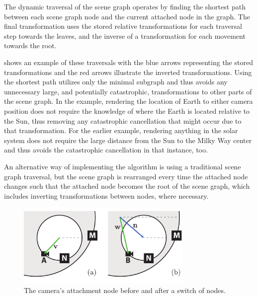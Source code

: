 The dynamic traversal of the scene graph operates by finding the shortest path between each scene graph node and the current attached node in the graph.  The final transformation uses the stored relative transformations for each traversal step towards the leaves, and the inverse of a transformation for each movement towards the root.

 shows an example of these traversals with the blue arrows representing the stored transformations and the red arrows illustrate the inverted transformations.  Using the shortest path utilizes only the minimal subgraph and thus avoids any unnecessary large, and potentially catastrophic, transformations to other parts of the scene graph.  In the example, rendering the location of Earth to either camera position does not require the knowledge of where the Earth is located relative to the Sun, thus removing any catastrophic cancellation that might occur due to that transformation.  For the earlier example, rendering anything in the solar system does not require the large distance from the Sun to the Milky Way center and thus avoids the catastrophic cancellation in that instance, too.

An alternative way of implementing the algorithm is using a traditional scene graph traversal, but the scene graph is rearranged every time the attached node changes such that the attached node becomes the root of the scene graph, which includes inverting transformations between nodes, where necessary.

\begin{figure}
\centering
\includegraphics[width=0.75\textwidth]{figures/contributions/dsg/attachment-switch.pdf}
\caption{The camera's attachment node before and after a switch of nodes.}
\label{contributions:astro:dsg:switch}
\end{figure}

